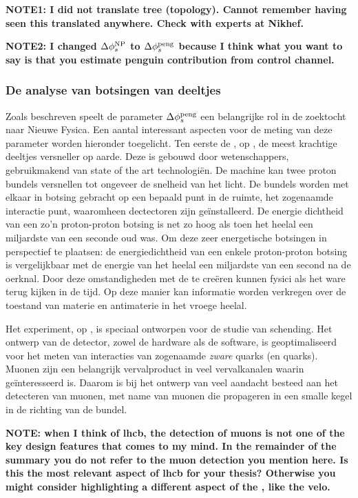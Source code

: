 \textbf{NOTE1: I did not translate tree (topology). Cannot remember having seen this translated anywhere.
Check with experts at Nikhef. }

\textbf{NOTE2: I changed $\Delta\phi_{s}^{\tiny \text{NP}}$  to $\Delta\phi_{s}^{\tiny\text{peng}}$ because I think what
you want to say is that you estimate penguin contribution from control channel. }

\subsubsection{De analyse van botsingen van deeltjes}
Zoals beschreven speelt de parameter $\Delta\phi_{s}^{\tiny\text{peng}}$ een belangrijke rol in de zoektocht naar Nieuwe Fysica. Een aantal interessant aspecten voor de meting van deze parameter worden hieronder toegelicht. Ten eerste de \lhc, op \cern, de meest krachtige deeltjes versneller op aarde. Deze is gebouwd door wetenschappers, gebruikmakend van state of the art technologi\"en. De machine kan twee proton bundels versnellen tot ongeveer de snelheid van het licht. De bundels worden met elkaar in botsing gebracht op een bepaald punt in de ruimte, het zogenaamde interactie punt, waaromheen dectectoren zijn ge\"installeerd. De energie dichtheid van een zo'n proton-proton botsing is net zo hoog als toen het heelal een miljardste van een seconde oud was. Om deze zeer energetische botsingen in perspectief te plaatsen: de energiedichtheid van een enkele proton-proton botsing is vergelijkbaar met de energie van het heelal een miljardste van een second na de oerknal. Door deze omstandigheden met de \lhc te cre\"eren kunnen fysici als het ware terug kijken  in de tijd. Op deze manier kan informatie worden verkregen over de toestand van materie en antimaterie in het vroege heelal.

Het \lhcb experiment, op \cern, is speciaal ontworpen voor de studie van \CP schending. Het ontwerp van de detector, zowel de hardware als de software, is geoptimaliseerd voor het meten van interacties van zogenaamde {\it zware} quarks (\bquark en \cquark quarks). Muonen zijn een belangrijk vervalproduct in veel vervalkanalen waarin \lhcb ge\"interesseerd is.  Daarom is bij het ontwerp van \lhcb veel aandacht besteed aan het detecteren van muonen, met name van muonen die propageren in een smalle kegel in de richting van de bundel.

\textbf{NOTE: when I think of lhcb, the detection of muons is not one of the key design features that comes to my mind. In the remainder of the summary you do not refer to the muon detection you mention here. Is this the most relevant aspect of lhcb for your thesis? Otherwise you might consider highlighting a different aspect of the \lhcb, like the velo. }

